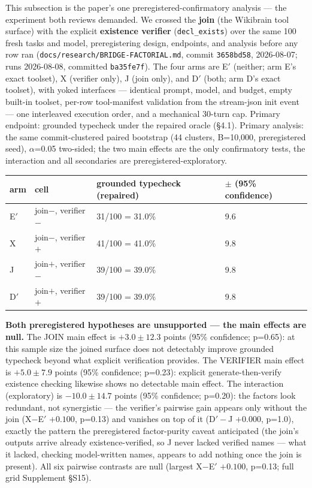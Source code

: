 \documentclass[10pt]{article}
\newcommand{\code}[1]{\texttt{#1}}
\newcommand{\Ssec}[1]{Supplement \S #1}
\begin{document}
This subsection is the paper's one preregistered-confirmatory analysis
--- the experiment both reviews demanded. We crossed the \textbf{join}
(the Wikibrain tool surface) with the explicit \textbf{existence
verifier} (\code{decl\_exists}) over the same 100 fresh tasks and
model, preregistering design, endpoints, and analysis before any row
ran (\code{docs/research/BRIDGE-FACTORIAL.md}, commit \code{3658bd58},
2026-08-07; runs 2026-08-08, committed \code{ba35fe7f}). The four arms
are E$'$ (neither; arm E's exact toolset), X (verifier only), J (join
only), and D$'$ (both; arm D's exact toolset), with yoked interfaces
--- identical prompt, model, and budget, empty built-in toolset,
per-row tool-manifest validation from the stream-json init event ---
one interleaved execution order, and a mechanical 30-turn cap. Primary
endpoint: grounded typecheck under the repaired oracle (\S 4.1).
Primary analysis: the same commit-clustered paired bootstrap (44
clusters, B=10{,}000, preregistered seed), $\alpha$=0.05 two-sided;
the two main effects are the only confirmatory tests, the interaction
and all secondaries are preregistered-exploratory.

\begin{center}\footnotesize
\begin{tabular}{@{}llll@{}}
\toprule
arm & cell & grounded typecheck (repaired) & $\pm$ (95\% confidence) \\
\midrule
E$'$ & join$-$, verifier$-$ & 31/100 = 31.0\% & 9.6 \\
X & join$-$, verifier$+$ & 41/100 = 41.0\% & 9.8 \\
J & join$+$, verifier$-$ & 39/100 = 39.0\% & 9.8 \\
D$'$ & join$+$, verifier$+$ & 39/100 = 39.0\% & 9.8 \\
\bottomrule
\end{tabular}
\end{center}

\textbf{Both preregistered hypotheses are unsupported --- the main
effects are null.} The JOIN main effect is $\mathbf{+3.0 \pm 12.3}$
points (95\% confidence; p=0.65): at this sample size the joined surface
does not detectably improve grounded typecheck beyond what explicit
verification provides. The VERIFIER main effect is $\mathbf{+5.0 \pm 7.9}$
points (95\% confidence; p=0.23): explicit generate-then-verify existence
checking likewise shows no detectable main effect. The interaction
(exploratory) is $\mathbf{-10.0 \pm 14.7}$ points (95\% confidence;
p=0.20): the
factors look redundant, not synergistic --- the verifier's pairwise
gain appears only without the join (X$-$E$'$ $+0.100$, p=0.13) and
vanishes on top of it (D$'-$J $+0.000$, p=1.0), exactly the pattern
the preregistered factor-purity caveat anticipated (the join's outputs
arrive already existence-verified, so J never lacked verified names
--- what it lacked, checking model-written names, appears to add
nothing once the join is present). All six pairwise contrasts are null
(largest X$-$E$'$ $+0.100$, p=0.13; full grid \Ssec{S15}).
\end{document}
